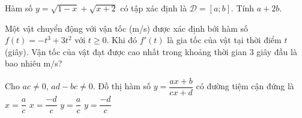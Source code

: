 \begin{bt}%
	Hàm số $y=\sqrt{1-x}+\sqrt{x+2}$ có tập xác định là  $\mathscr{D}=\left[a;b\right]$. Tính $a+2b$.
\end{bt}

\begin{bt}%
	Một vật chuyển động với vận tốc (m/s) được xác định bởi hàm số $f(t) = -t^3 + 3t^2$ với $t \geq 0$. Khi đó $f'(t)$ là gia tốc của vật tại thời điểm $t$ (giây). Vận tốc của vật đạt được cao nhất trong khoảng thời gian $3$ giây đầu là  bao nhiêu m/s?
\end{bt}

\begin{ex}%
	 Cho $ac\neq 0$, $ad-bc\neq 0$. Đồ thị hàm số $y=\dfrac{ax+b}{cx+d}$ có đường tiệm cận đứng là
	 \choice
		{$x=\dfrac{a}{c}$} 
		{\True  $x=\dfrac{-d}{c}$}
		 {$y=\dfrac{a}{c}$}
		 {$y=\dfrac{-d}{c}$}
\end{ex}


